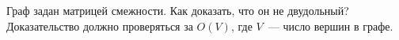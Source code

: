 Граф задан матрицей смежности. Как доказать, что он не двудольный? Доказательство должно проверяться за $O(V)$, где $V$~---
число вершин в графе.